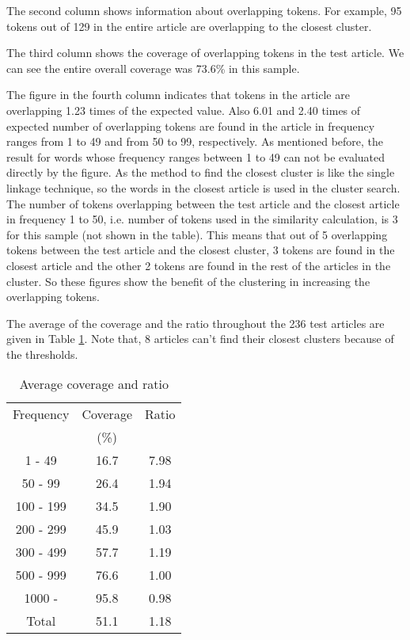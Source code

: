 The second column shows information about overlapping tokens.
For example, 95 tokens out of 129 in the entire
article are overlapping to the closest cluster.

The third column shows the coverage of overlapping tokens in the test article.
We can see the entire overall coverage was 73.6\% in this sample.

The figure in the fourth column indicates that tokens in the article
are overlapping 1.23 times of the expected value.
Also 6.01 and 2.40 times of expected number of overlapping tokens are found in the article
in frequency ranges from 1 to 49 and from 50 to 99, respectively. 
As mentioned before, the result for words whose frequency ranges between
1 to 49 can not be evaluated directly by the figure.
As the method to find the closest cluster is like the single linkage technique,
so the words in the closest article is used in the cluster search.
The number of tokens overlapping between the test article and the closest article
in frequency 1 to 50, i.e. number of tokens used in the similarity
calculation, is 3 for this sample (not shown in the table).
This means that out of 5 overlapping tokens between the test article and the
closest cluster, 3 tokens are found in the closest article and the other 2 tokens are
found in the rest of the articles in the cluster.
So these figures show the benefit of the clustering in increasing
the overlapping tokens.

The average of the coverage and the ratio throughout the 236 test articles are given
in Table \ref{T3}. Note that, 8 articles can't find their closest
clusters because of the thresholds.

\begin{table}[hbt]
\begin{center}
\begin{tabular}{|c||c|c|}
\hline
Frequency &   Coverage &  Ratio   \\
          &   (\%)     &          \\
\hline
1 - 49    &     16.7   &  7.98  \\
50 - 99   &     26.4   &  1.94  \\
100 - 199 &     34.5   &  1.90  \\
200 - 299 &     45.9   &  1.03  \\
300 - 499 &     57.7   &  1.19  \\
500 - 999 &     76.6   &  1.00  \\
1000 -    &     95.8   &  0.98  \\
\hline
Total     &     51.1   &  1.18  \\
\hline
\end{tabular}
\caption{\label{T3} Average coverage and ratio}
\end{center}
\end{table}

